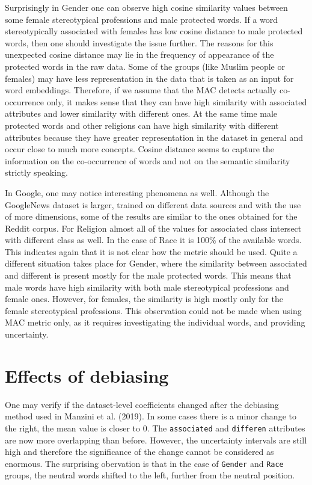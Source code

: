 \documentclass[10pt,dvipsnames,enabledeprecatedfontcommands]{scrartcl}
\begin{document}
Surprisingly in Gender one can observe high cosine similarity values
between some female stereotypical professions and male protected words.
If a word stereotypically associated with females has low cosine
distance to male protected words, then one should investigate the issue
further. The reasons for this unexpected cosine distance may lie in the
frequency of appearance of the protected words in the raw data. Some of
the groups (like Muslim people or females) may have less representation
in the data that is taken as an input for word embeddings. Therefore, if
we assume that the MAC detects actually co-occurrence only, it makes
sense that they can have high similarity with associated attributes and
lower similarity with different ones. At the same time male protected
words and other religions can have high similarity with different
attributes because they have greater representation in the dataset in
general and occur close to much more concepts. Cosine distance seems to
capture the information on the co-occurrence of words and not on the
semantic similarity strictly speaking.

In Google, one may notice interesting phenomena as well. Although the
GoogleNews dataset is larger, trained on different data sources and with
the use of more dimensions, some of the results are similar to the ones
obtained for the Reddit corpus. For Religion almost all of the values
for associated class intersect with different class as well. In the case
of Race it is 100\% of the available words. This indicates again that it
is not clear how the metric should be used. Quite a different situation
takes place for Gender, where the similarity between associated and
different is present mostly for the male protected words. This means
that male words have high similarity with both male stereotypical
professions and female ones. However, for females, the similarity is
high mostly only for the female stereotypical professions. This
observation could not be made when using MAC metric only, as it requires
investigating the individual words, and providing uncertainty.

\section{Effects of debiasing}\label{effects-of-debiasing}

One may verify if the dataset-level coefficients changed after the
debiasing method used in Manzini et al. (2019). In some cases there is a
minor change to the right, the mean value is closer to 0. The
\texttt{associated} and \texttt{differen} attributes are now more
overlapping than before. However, the uncertainty intervals are still
high and therefore the significance of the change cannot be considered
as enormous. The surprising obervation is that in the case of
\texttt{Gender} and \texttt{Race} groups, the neutral words shifted to
the left, further from the neutral position.
\end{document}
